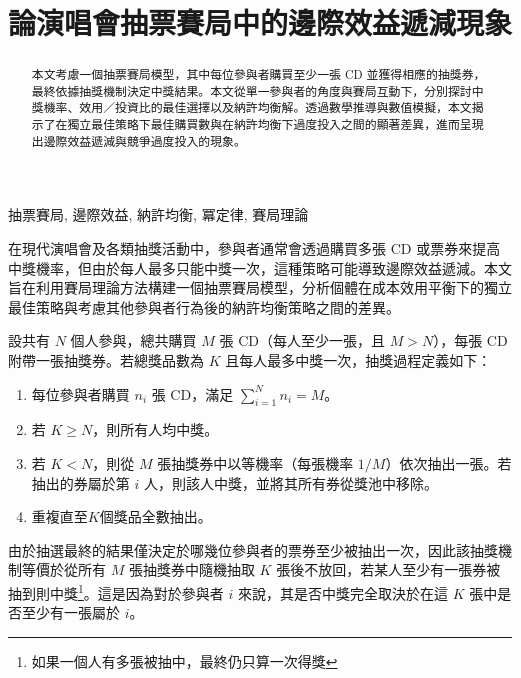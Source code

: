 \documentclass[conference]{IEEEtran}
\begin{document}
\begin{CJK}{UTF8}{bkai}

\title{論演唱會抽票賽局中的邊際效益遞減現象}

\author{}

\maketitle

\begin{abstract}
本文考慮一個抽票賽局模型，其中每位參與者購買至少一張 CD 並獲得相應的抽獎券，最終依據抽獎機制決定中獎結果。本文從單一參與者的角度與賽局互動下，分別探討中獎機率、效用／投資比的最佳選擇以及納許均衡解。透過數學推導與數值模擬，本文揭示了在獨立最佳策略下最佳購買數與在納許均衡下過度投入之間的顯著差異，進而呈現出邊際效益遞減與競爭過度投入的現象。
\end{abstract}

\begin{IEEEkeywords}
抽票賽局, 邊際效益, 納許均衡, 冪定律, 賽局理論
\end{IEEEkeywords}


在現代演唱會及各類抽獎活動中，參與者通常會透過購買多張 CD 或票券來提高中獎機率，但由於每人最多只能中獎一次，這種策略可能導致邊際效益遞減。本文旨在利用賽局理論方法構建一個抽票賽局模型，分析個體在成本效用平衡下的獨立最佳策略與考慮其他參與者行為後的納許均衡策略之間的差異。


設共有 $N$ 個人參與，總共購買 $M$ 張 CD（每人至少一張，且 $M>N$），每張 CD 附帶一張抽獎券。若總獎品數為 $K$ 且每人最多中獎一次，抽獎過程定義如下：
\begin{enumerate}
    \item 每位參與者購買 $n_i$ 張 CD，滿足 $\sum_{i=1}^{N} n_i=M$。
    \item 若 $K \ge N$，則所有人均中獎。
    \item 若 $K<N$，則從 $M$ 張抽獎券中以等機率（每張機率 $1/M$）依次抽出一張。若抽出的券屬於第 $i$ 人，則該人中獎，並將其所有券從獎池中移除。
    \item 重複直至$K$個獎品全數抽出。
\end{enumerate}


由於抽選最終的結果僅決定於哪幾位參與者的票券至少被抽出一次，因此該抽獎機制等價於從所有 $M$ 張抽獎券中隨機抽取 $K$ 張後不放回，若某人至少有一張券被抽到則中獎\footnote{如果一個人有多張被抽中，最終仍只算一次得獎}。這是因為對於參與者 $i$ 來說，其是否中獎完全取決於在這 $K$ 張中是否至少有一張屬於 $i$。


\end{CJK}
\end{document}
